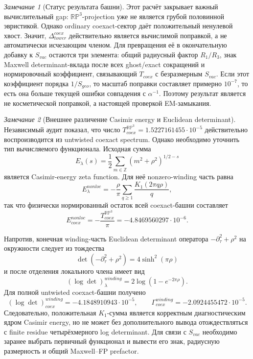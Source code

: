 \documentclass[12pt,a4paper]{report}
\theoremstyle{remark}
\newtheorem{remark}{Замечание}[chapter]
\begin{document}
\begin{remark}[Статус результата башни]
Этот расчёт закрывает важный вычислительный gap: \(\mathbb{RP}^3\)-projection уже не является грубой половинной эвристикой. Однако ordinary coexact-сектор даёт положительный ненулевой хвост. Значит, \(\Delta_{tower}^{coex}\) действительно является вычислимой поправкой, а не автоматически исчезающим членом. Для превращения её в окончательную добавку к \(S_{vac}\) остаются три элемента: общий радиусный фактор \(R_1/R_3\), знак Maxwell determinant-вклада после всех ghost/exact сокращений и нормировочный коэффициент, связывающий \(T_{coex}\) с безразмерным \(S_{vac}\). Если этот коэффициент порядка \(1/S_{geo}\), то масштаб поправки составляет примерно \(10^{-7}\), то есть она больше текущей ошибки совпадения с \(\alpha^{-1}\). Поэтому результат является не косметической поправкой, а настоящей проверкой EM-замыкания.
\end{remark}
\begin{remark}[Внешнее различение Casimir energy и Euclidean determinant]
Независимый аудит показал, что число
\(
T_{coex}^{\mathbb{RP}^3}=1.5227161455\cdot10^{-5}
\)
действительно воспроизводится из untwisted coexact spectrum. Однако необходимо уточнить тип вычисляемого функционала. Исходная сумма
\[
E_\lambda(s)=\frac12\sum_{m\in\mathbb Z}(m^2+\rho^2)^{1/2-s}
\]
является Casimir-energy zeta function. Для неё nonzero-winding часть равна
\[
E_\lambda^{nonloc}
=-\frac{\rho}{\pi}\sum_{q\geq1}\frac{K_1(2\pi q\rho)}{q},
\]
так что физически нормированный остаток всей coexact-башни составляет
\[
E_{coex}^{nonloc}=-\frac{T_{coex}^{\mathbb{RP}^3}}{\pi}
=-4.8469560297\cdot10^{-6}.
\]

Напротив, конечная winding-часть Euclidean determinant оператора
\(-\partial_\tau^2+\rho^2\) на окружности следует из тождества
\[
\det(-\partial_\tau^2+\rho^2)=4\sinh^2(\pi\rho)
\]
и после отделения локального члена имеет вид
\[
(\log\det)_\lambda^{winding}=2\log(1-e^{-2\pi\rho}).
\]
Для полной untwisted coexact-башни получено
\[
(\log\det)_{coex}^{winding}=-4.1848910943\cdot10^{-5},
\qquad
\Gamma_{coex}^{winding}=-2.0924455472\cdot10^{-5}.
\]
Следовательно, положительная \(K_1\)-сумма является корректным диагностическим ядром Casimir energy, но не может без дополнительного вывода отождествляться с finite residue четырёхмерного log determinant. Для связи с \(S_{vac}\) необходимо заранее выбрать первичный функционал и вывести его знак, радиусную размерность и общий Maxwell--FP prefactor.
\end{remark}
\end{document}
